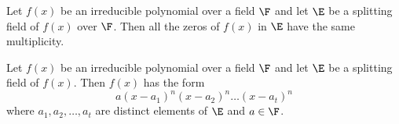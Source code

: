 \begin{theorem}
	Let $f(x)$ be an irreducible polynomial over a field $\F$ and let $\E$ be a splitting field of $f(x)$ over $\F$. Then all the zeros of $f(x)$ in $\E$ have the same multiplicity.
\end{theorem}

\begin{corollary}
	Let $f(x)$ be an irreducible polynomial over a field $\F$ and let $\E$ be a splitting field of $f(x)$. Then $f(x)$ has the form
	\[ a(x-a_1)^n(x-a_2)^n\dots(x-a_t)^n \]
	where $a_1,a_2,\dots,a_t$ are distinct elements of $\E$ and $a \in \F$.
\end{corollary}
